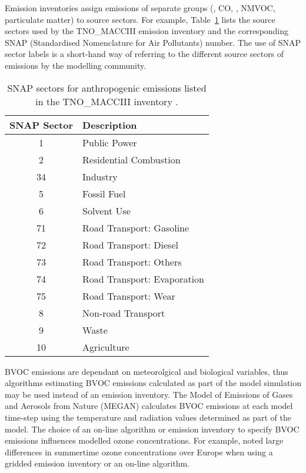 Emission inventories assign emissions of separate groups (, CO, , NMVOC, particulate matter) to source sectors. 
For example, Table~\ref{t:SNAP} lists the source sectors used by the TNO\_MACCIII emission inventory and the corresponding SNAP (Standardised Nomenclature for Air Pollutants) number.
The use of SNAP sector labels is a short-hand way of referring to the different source sectors of emissions by the modelling community. 

\begin{table}[t]
    \centering
    \caption[SNAP sectors in the TNO\_MACCIII]{SNAP sectors for anthropogenic emissions listed in the TNO\_MACCIII inventory \citep{Kuenen:2014}.}
    \begin{tabular}{cl}
        \hline \hline
        \textbf{SNAP Sector} & \textbf{Description} \\
        \hline \hline
        1 & Public Power \\
        2 & Residential Combustion \\
        34 & Industry \\
        5 & Fossil Fuel \\
        6 & Solvent Use \\
        71 & Road Transport: Gasoline \\
        72 & Road Transport: Diesel \\
        73 & Road Transport: Others \\
        74 & Road Transport: Evaporation \\
        75 & Road Transport: Wear \\
        8 & Non-road Transport \\
        9 & Waste \\
        10 & Agriculture \\
        \hline \hline
    \end{tabular}
    \label{t:SNAP}
\end{table}

BVOC emissions are dependant on meteorolgical and biological variables, thus algorithms estimating BVOC emissions calculated as part of the model simulation may be used instead of an emission inventory.
The Model of Emissions of Gases and Aerosols from Nature (MEGAN) \citep{Guenther:2006, Guenther:2012} calculates BVOC emissions at each model time-step using the temperature and radiation values determined as part of the model.
The choice of an on-line algorithm or emission inventory to specify BVOC emissions influences modelled ozone concentrations. 
For example, \citet{Curci:2009} noted large differences in summertime ozone concentrations over Europe when using a gridded emission inventory or an on-line algorithm.

